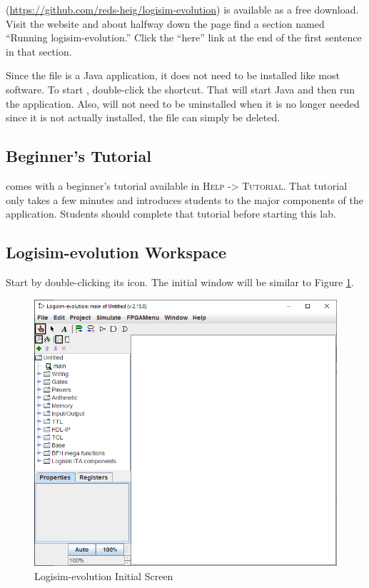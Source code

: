 \LE (\url{https://github.com/reds-heig/logisim-evolution}) is available as a free download. Visit the website and about halfway down the page find a section named ``Running logisim-evolution.'' Click the ``here'' link at the end of the first sentence in that section. 

Since the \LE file is a Java application, it does not need to be installed like most software. To start \LE, double-click the \LE shortcut. That will start Java and then run the \LE application. Also, \LE will not need to be uninstalled when it is no longer needed since it is not actually installed, the \LE file can simply be deleted.

\subsection{Beginner's Tutorial}

\LE comes with a beginner's tutorial available in \textsc{Help -> Tutorial}. That tutorial only takes a few minutes and introduces students to the major components of the application. Students should complete that tutorial before starting this lab.

\subsection{Logisim-evolution Workspace}

Start \LE by double-clicking its icon. The initial \LE window will be similar to Figure \ref{fig:intro-01}.

\begin{figure}[H]
	\centering
	\includegraphics[width=\maxwidth{.95\linewidth}]{gfx/intro-01}
	\caption{Logisim-evolution Initial Screen}
	\label{fig:intro-01}
\end{figure}

